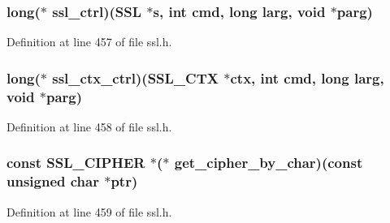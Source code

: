 \subsubsection[{\texorpdfstring{ssl\+\_\+ctrl}{ssl_ctrl}}]{\setlength{\rightskip}{0pt plus 5cm}long($\ast$ ssl\+\_\+ctrl)({\bf S\+SL} $\ast$s, int cmd, long larg, {\bf void} $\ast$parg)}\hypertarget{structssl__method__st_a0b2b4d082aa633a74696197d5a9725de}{}\label{structssl__method__st_a0b2b4d082aa633a74696197d5a9725de}


Definition at line 457 of file ssl.\+h.

\subsubsection[{\texorpdfstring{ssl\+\_\+ctx\+\_\+ctrl}{ssl_ctx_ctrl}}]{\setlength{\rightskip}{0pt plus 5cm}long($\ast$ ssl\+\_\+ctx\+\_\+ctrl)({\bf S\+S\+L\+\_\+\+C\+TX} $\ast$ctx, int cmd, long larg, {\bf void} $\ast$parg)}\hypertarget{structssl__method__st_a695737964e2f49cf0007c3815273b1b3}{}\label{structssl__method__st_a695737964e2f49cf0007c3815273b1b3}


Definition at line 458 of file ssl.\+h.

\subsubsection[{\texorpdfstring{get\+\_\+cipher\+\_\+by\+\_\+char}{get_cipher_by_char}}]{\setlength{\rightskip}{0pt plus 5cm}const {\bf S\+S\+L\+\_\+\+C\+I\+P\+H\+ER} $\ast$($\ast$ get\+\_\+cipher\+\_\+by\+\_\+char)(const unsigned char $\ast$ptr)}\hypertarget{structssl__method__st_a5ee9e79cd101a7db7c5e488f265c9434}{}\label{structssl__method__st_a5ee9e79cd101a7db7c5e488f265c9434}


Definition at line 459 of file ssl.\+h.

